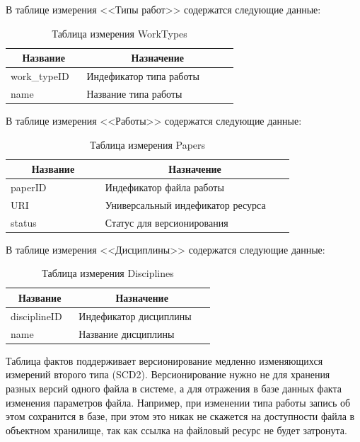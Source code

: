 \documentclass[a4paper,14pt]{extarticle}
\newcommand{\heading}[1]{\multicolumn{1}{|c|}{\textbf{#1}}}
\begin{document}
В таблице измерения <<Типы работ>> содержатся следующие данные:
\begin{table}[h!]
	\caption{Таблица измерения WorkTypes}
	\begin{tabular}{|p{0.3\linewidth}|p{0.6\linewidth}|}
		\hline
		\heading{Название} & \heading{Назначение} \\ \hline
		work\_typeID & Индефикатор типа работы \\ \hline
		name & Название типа работы \\ \hline
	\end{tabular}
	\label{tab:worktypes}
\end{table}


В таблице измерения <<Работы>> содержатся следующие данные:
\begin{table}[h!]
	\caption{Таблица измерения Papers}
	\begin{tabular}{|p{0.3\linewidth}|p{0.6\linewidth}|}
		\hline
		\heading{Название} & \heading{Назначение} \\ \hline
		paperID & Индефикатор файла работы \\ \hline
		URI & Универсальный индефикатор ресурса \\ \hline
		status & Статус для версионирования \\ \hline
	\end{tabular}
	\label{tab:papers}
\end{table}

В таблице измерения <<Дисциплины>> содержатся следующие данные:
\begin{table}[h!]
	\caption{Таблица измерения Disciplines}
	\begin{tabular}{|p{0.3\linewidth}|p{0.6\linewidth}|}
		\hline
		\heading{Название} & \heading{Назначение} \\ \hline
		disciplineID & Индефикатор дисциплины  \\ \hline
		name & Название дисциплины \\ \hline
	\end{tabular}
	\label{tab:disciplines}
\end{table}

Таблица фактов поддерживает версионирование медленно изменяющихся измерений второго типа (SCD2). Версионирование нужно не для хранения разных версий одного файла в системе, а для отражения в базе данных факта изменения параметров файла. Например, при изменении типа работы запись об этом сохранится в базе, при этом это никак не скажется на доступности файла в объектном хранилище, так как ссылка на файловый ресурс не будет затронута.
\end{document}

